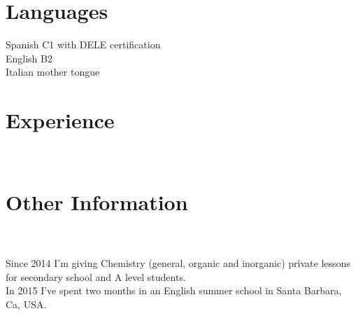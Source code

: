 \documentclass[]{twentysecondcv}
\begin{document}
\section{Languages}

Spanish C1 with DELE certification \\
English B2 \\
Italian mother tongue \\

\section{Experience} \\
\begin{twenty}
\end{twenty}

\section{Other Information} \\ \\
Since 2014 I'm giving Chemistry (general, organic and inorganic) private lessons for secondary school and A level students. \\
In 2015 I've spent two months in an English summer school in Santa Barbara, Ca, USA.
\end{document}
